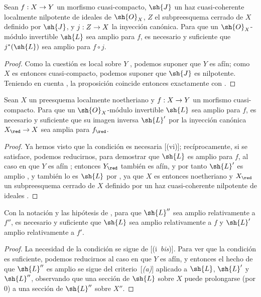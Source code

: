 \documentclass[oneside,10pt]{amsart}
\makeatletter
\newcommand{\ega@arrow}[2]{\mathchoice{#1}{#2}{#2}{#2}}
\renewcommand{\to}{\ega@arrow{\longrightarrow}{\rightarrow}}
\newcommand{\oldpage}[2][]{\marginnote{\normalfont\footnotesize\textbf{#1}~|~#2}\ignorespaces}
\let\EGAOriginalLabel\label
\renewcommand{\label}[1]{\phantomsection\EGAOriginalLabel{#1}}
\makeatother
\begin{document}
\begin{proposition}[4.6.15]
\label{II.4.6.15}
Sean $f:X\to Y$ un morfismo cuasi-compacto, $\sh{J}$ un haz cuasi-coherente localmente nilpotente de ideales de $\sh{O}_X$, $Z$ el subpreesquema cerrado de $X$ definido por $\sh{J}$, y $j:Z\to X$ la inyección canónica.
Para que un $\sh{O}_X$-módulo invertible $\sh{L}$ sea amplio para $f$, es necesario y suficiente que $j^*(\sh{L})$ sea amplio para $f\circ j$.
\end{proposition}

\begin{proof}
Como la cuestión es local sobre $Y$ , podemos suponer que $Y$ es afín;
como $X$ es entonces cuasi-compacto, podemos suponer que $\sh{J}$ es nilpotente.
Teniendo en cuenta , la proposición coincide entonces exactamente con .
\end{proof}

\begin{corollary}[4.6.16]
\label{II.4.6.16}
Sean $X$ un preesquema localmente noetheriano y $f:X\to Y$ un morfismo cuasi-compacto.
Para que un $\sh{O}_X$-módulo invertible $\sh{L}$ sea amplio para $f$, es necesario y suficiente que su imagen inversa $\sh{L}'$ por la inyección canónica $X_\red\to X$ sea amplia para $f_\red$.
\end{corollary}

\begin{proof}
Ya hemos visto que la condición es necesaria [(vi)];
recíprocamente, si se satisface, podemos reducirnos, para demostrar que $\sh{L}$ es amplio para $f$, al caso en que $Y$ es afín ;
entonces $Y_\red$ también es afín, y por tanto $\sh{L}'$ es amplio , y también lo es $\sh{L}$ por , ya que $X$ es entonces noetheriano y $X_\red$ un subpreesquema cerrado de $X$ definido por un haz cuasi-coherente nilpotente de ideales .
\end{proof}

\begin{proposition}[4.6.17]
\label{II.4.6.17}
Con la notación y las hipótesis de , para que $\sh{L}''$ sea amplio relativamente a $f''$, es necesario y suficiente que $\sh{L}$ sea amplio relativamente a $f$ y $\sh{L}'$ amplio relativamente a $f'$.
\end{proposition}

\oldpage[II]{94}
\begin{proof}
La necesidad de la condición se sigue de [(i~\emph{bis})].
Para ver que la condición es suficiente, podemos reducirnos al caso en que $Y$ es afín, y entonces el hecho de que $\sh{L}''$ es amplio se sigue del criterio~[\emph{(a)}] aplicado a $\sh{L}$, $\sh{L}'$ y $\sh{L}''$, observando que una sección de $\sh{L}$ sobre $X$ puede prolongarse (por $0$) a una sección de $\sh{L}''$ sobre $X''$.
\end{proof}
\end{document}
